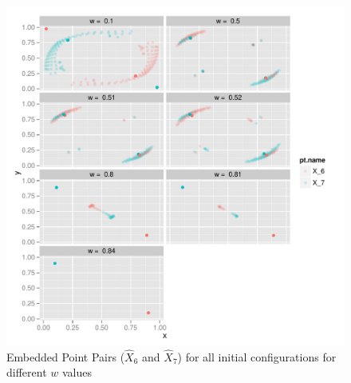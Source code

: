 \documentclass[12pt,oneside,final]{thesis}\usepackage[]{graphicx}\usepackage[]{color}
\makeatletter
\def\maxwidth{ %
  \ifdim\Gin@nat@width>\linewidth
    \linewidth
  \else
    \Gin@nat@width
  \fi
}
\newenvironment{knitrout}{}{} %
\makeatother
\begin{document}
\begin{knitrout}
\color{fgcolor}\begin{figure}[]

\includegraphics[width=\maxwidth]{figure/plot_final_pts_all_w} \caption[Embedded Point Pairs ($\hat{X}_6$ and $\hat{X}_7$) for all initial configurations for different $w$ values]{Embedded Point Pairs ($\hat{X}_6$ and $\hat{X}_7$) for all initial configurations for different $w$ values\label{fig:plot_final_pts_all_w}}
\end{figure}


\end{knitrout}



\begin{knitrout}
\color{fgcolor}




































\end{knitrout}
\end{document}
